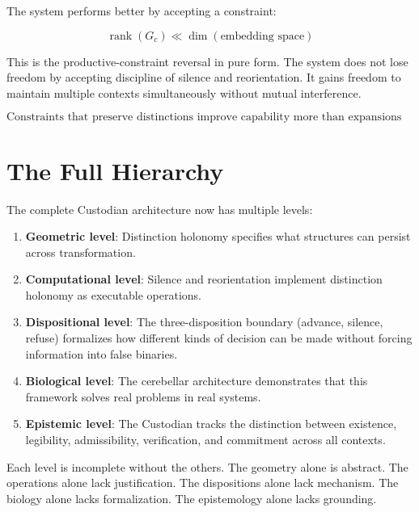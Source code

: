 \documentclass[12pt]{article}
\begin{document}
The system performs better by accepting a constraint:

\begin{equation}
\operatorname{rank}(G_c) \ll \operatorname{dim}(\text{embedding space})
\end{equation}

This is the productive-constraint reversal in pure form. The system does not lose freedom by accepting discipline of silence and reorientation. It gains freedom to maintain multiple contexts simultaneously without mutual interference.

\begin{equation}
\boxed{\text{Constraints that preserve distinctions improve capability more than expansions that eliminate them}}
\end{equation}

\section{The Full Hierarchy}

The complete Custodian architecture now has multiple levels:

\begin{enumerate}

\item \textbf{Geometric level}: Distinction holonomy specifies what structures can persist across transformation.

\item \textbf{Computational level}: Silence and reorientation implement distinction holonomy as executable operations.

\item \textbf{Dispositional level}: The three-disposition boundary (advance, silence, refuse) formalizes how different kinds of decision can be made without forcing information into false binaries.

\item \textbf{Biological level}: The cerebellar architecture demonstrates that this framework solves real problems in real systems.

\item \textbf{Epistemic level}: The Custodian tracks the distinction between existence, legibility, admissibility, verification, and commitment across all contexts.

\end{enumerate}

Each level is incomplete without the others. The geometry alone is abstract. The operations alone lack justification. The dispositions alone lack mechanism. The biology alone lacks formalization. The epistemology alone lacks grounding.
\end{document}
